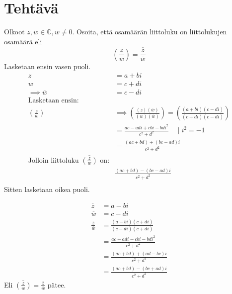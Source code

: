 \documentclass{article}
\newcounter{tehtava}
\begin{document}
\newpage
{}
\section*{Tehtävä \thetehtava}
Olkoot $z, w \in \mathbb{C}, w \neq 0$. Osoita, että osamäärän liittoluku on liittolukujen osamäärä eli
\[
    \overline{\left(\frac{z}{w}\right)} = \frac{\overline{z}}{\overline{w}}
\]
Lasketaan ensin vasen puoli.
\[
    \begin{aligned}
        z &= a + bi \\
        w &= c + di \\
        \implies \overline{w} &= c - di \\[10pt]
        \text{Lasketaan ensin:} \\
        \left(\frac{z}{w}\right) &\implies\left(\frac{(z)(\overline{w})}{(w)(\overline{w})}\right) = \left(\frac{(a + bi)(c -di)}{(c + di)(c - di)}\right) \\
        &= \frac{ac - adi + cbi - bdi^2}{c^2 + d^2} \quad \mid i^2 = -1 \\
        &= \frac{(ac + bd) + (bc - ad)i}{c^2 + d^2} \\
        \text{Jolloin liittoluku } \overline{\left(\frac{z}{w}\right)} \text{ on:}\\
        &\frac{(ac + bd) - (bc - ad)i}{c^2 + d^2} \\
    \end{aligned}
 \]
Sitten lasketaan oikea puoli.


\[
    \begin{aligned}
        \overline{z} &= a - bi\\
        \overline{w} &= c - di\\[10pt]
        \frac{\overline{z}}{\overline{w}} &= \frac{(a - bi)(c + di)}{(c - di)(c + di)}\\
        &= \frac{ac +adi -cbi -bdi^2}{c^2 + d^2}\\
        &= \frac{(ac + bd)  + (ad -bc)i }{c^2 + d^2}\\
        &= \frac{(ac + bd)  - (bc + ad)i }{c^2 + d^2}
    \end{aligned}
\]
Eli $\overline{\left(\frac{z}{w}\right)} = \frac{\overline{z}}{\overline{w}}$ pätee.
\end{document}

